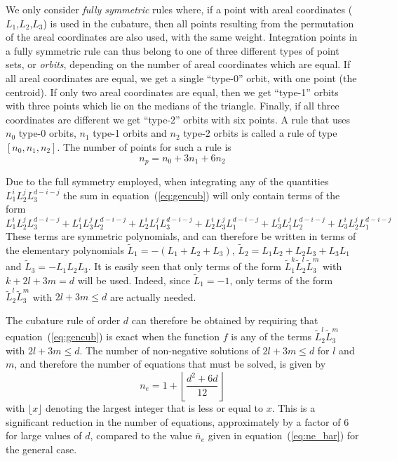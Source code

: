 \documentclass{article}
\begin{document}
We only consider \emph{fully symmetric} rules where, if a point with areal coordinates ($L_1$,$L_2$,$L_3$) is used in the cubature, then all points resulting from the permutation of the areal coordinates are also used, with the same weight.
Integration points in a fully symmetric rule can thus belong to one of three different types of point sets, or \emph{orbits}, depending on the number of areal coordinates which are equal. If all areal coordinates are equal, we get a single ``type-0'' orbit, with one point (the centroid). If only two areal coordinates are equal, then we get ``type-1'' orbits with three points which lie on the medians of the triangle. Finally, if all three coordinates are different we get ``type-2'' orbits with six points.
A rule that uses $n_0$ type-0 orbits, $n_1$ type-1 orbits and $n_2$ type-2 orbits is called a rule of type $[n_0,n_1,n_2]$. The number of points for such a rule is
\begin{equation}
  \label{eq:np}
  n_p=n_0 + 3 n_1 + 6 n_2
\end{equation}



Due to the full symmetry employed, when integrating any of the quantities $L_1^i L_2^j L_3^{d-i-j}$ the sum in equation~(\ref{eq:gencub}) will only contain terms of the form
\begin{equation}
   L_1^i L_2^j L_3^{d-i-j} +
   L_1^i L_3^j L_2^{d-i-j} +
   L_2^i L_1^j L_3^{d-i-j} +
   L_2^i L_3^j L_1^{d-i-j} +
   L_3^i L_1^j L_2^{d-i-j} +
   L_3^i L_2^j L_1^{d-i-j}
\end{equation}
These terms are symmetric polynomials, and can therefore be written in terms of the elementary polynomials $\tilde{L}_1 = -(L_1+L_2+L_3)$, $\tilde{L}_2 = L_1 L_2 + L_2 L_3 + L_3 L_1$ and $\tilde{L}_3 = -L_1 L_2 L_3$. It is easily seen that only terms of the form $\tilde{L}_1^k \tilde{L}_2^l \tilde{L}_3^m$ with $k+2l+3m=d$ will be used. Indeed, since $\tilde{L}_1=-1$, only terms of the form $\tilde{L}_2^l \tilde{L}_3^m$ with $2l+3m \leq d$ are actually needed.

The cubature rule of order $d$ can therefore be obtained by requiring that equation~(\ref{eq:gencub}) is exact when the function $f$ is any of the terms $\tilde{L}_2^l \tilde{L}_3^m$ with $2 l + 3 m \leq d$. The number of non-negative solutions of $2 l + 3 m \leq d$ for $l$ and $m$, and therefore the number of equations that must be solved, is given by~\citep{oeisA001399}
\begin{equation}
  \label{eq:numeqs}
  n_e = 1+ \left\lfloor \frac{d^2+6 d}{12} \right\rfloor
\end{equation}
with $\lfloor x \rfloor$ denoting the largest integer that is less or equal to $x$. This is a significant reduction in the number of equations, approximately by a factor of 6 for large values of $d$, compared to the value $\bar{n}_e$ given in equation~(\ref{eq:ne_bar}) for the general case.
\end{document}
